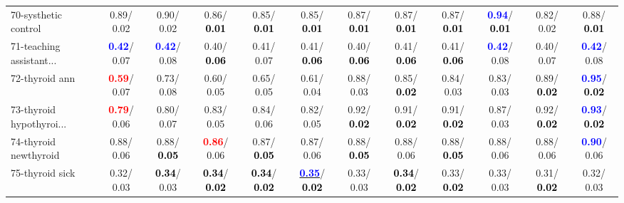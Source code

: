 \begin{table}[h]
\begin{center}
{\begin{tabular}{lc|c|c|c|c|c|c|c|c|c|c}
70-systhetic control &   0.89/  0.02 &   0.90/  0.02 &   0.86/\textcolor{black}{\textbf{  0.01}} &   0.85/\textcolor{black}{\textbf{  0.01}} &   0.85/\textcolor{black}{\textbf{  0.01}} &   0.87/\textcolor{black}{\textbf{  0.01}} &   0.87/\textcolor{black}{\textbf{  0.01}} &   0.87/\textcolor{black}{\textbf{  0.01}} & \textcolor{blue}{\textbf{  0.94}}/\textcolor{black}{\textbf{  0.01}} &   0.82/  0.02 &   0.88/\textcolor{black}{\textbf{  0.01}} \\
71-teaching assistant... & \textcolor{blue}{\textbf{  0.42}}/  0.07 & \textcolor{blue}{\textbf{  0.42}}/  0.08 &   0.40/\textcolor{black}{\textbf{  0.06}} &   0.41/  0.07 &   0.41/\textcolor{black}{\textbf{  0.06}} &   0.40/\textcolor{black}{\textbf{  0.06}} &   0.41/\textcolor{black}{\textbf{  0.06}} &   0.41/\textcolor{black}{\textbf{  0.06}} & \textcolor{blue}{\textbf{  0.42}}/  0.08 &   0.40/  0.07 & \textcolor{blue}{\textbf{  0.42}}/  0.08 \\ \hline
72-thyroid ann & \textcolor{red}{\textbf{  0.59}}/  0.07 &   0.73/  0.08 &   0.60/  0.05 &   0.65/  0.05 &   0.61/  0.04 &   0.88/  0.03 &   0.85/\textcolor{black}{\textbf{  0.02}} &   0.84/  0.03 &   0.83/  0.03 &   0.89/\textcolor{black}{\textbf{  0.02}} & \textcolor{blue}{\textbf{  0.95}}/\textcolor{black}{\textbf{  0.02}} \\
73-thyroid hypothyroi... & \textcolor{red}{\textbf{  0.79}}/  0.06 &   0.80/  0.07 &   0.83/  0.05 &   0.84/  0.06 &   0.82/  0.05 &   0.92/\textcolor{black}{\textbf{  0.02}} &   0.91/\textcolor{black}{\textbf{  0.02}} &   0.91/\textcolor{black}{\textbf{  0.02}} &   0.87/  0.03 &   0.92/\textcolor{black}{\textbf{  0.02}} & \textcolor{blue}{\textbf{  0.93}}/\textcolor{black}{\textbf{  0.02}} \\
74-thyroid newthyroid &   0.88/  0.06 &   0.88/\textcolor{black}{\textbf{  0.05}} & \textcolor{red}{\textbf{  0.86}}/  0.06 &   0.87/\textcolor{black}{\textbf{  0.05}} &   0.87/  0.06 &   0.88/\textcolor{black}{\textbf{  0.05}} &   0.88/  0.06 &   0.88/\textcolor{black}{\textbf{  0.05}} &   0.88/  0.06 &   0.88/  0.06 & \textcolor{blue}{\textbf{  0.90}}/  0.06 \\
75-thyroid sick &   0.32/  0.03 & \textcolor{black}{\textbf{  0.34}}/  0.03 & \textcolor{black}{\textbf{  0.34}}/\textcolor{black}{\textbf{  0.02}} & \textcolor{black}{\textbf{  0.34}}/\textcolor{black}{\textbf{  0.02}} & \underline{\textcolor{blue}{\textbf{  0.35}}}/\textcolor{black}{\textbf{  0.02}} &   0.33/  0.03 & \textcolor{black}{\textbf{  0.34}}/\textcolor{black}{\textbf{  0.02}} &   0.33/\textcolor{black}{\textbf{  0.02}} &   0.33/  0.03 &   0.31/\textcolor{black}{\textbf{  0.02}} &   0.32/  0.03 \\

\end{tabular}}
\end{center}
\end{table}
